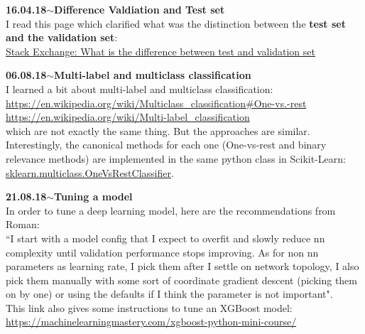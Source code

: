 \documentclass[11pt,a4paper]{article}
\newenvironment{loggentry}[2]%
{\noindent\textbf{#1}\hspace{1cm}$\mathbf{\sim}$\text{ }\textbf{#2}\\}{\vspace{0.5cm}}
\begin{document}
\begin{loggentry}{16.04.18}{Difference Valdiation and Test set}
I read this page which clarified what was the distinction between the \textbf{test set and the validation set}:\\
\href{https://stats.stackexchange.com/questions/19048/what-is-the-difference-between-test-set-and-validation-set#19051}{Stack Exchange: What is the difference between test and validation set}
\end{loggentry}

\begin{loggentry}{06.08.18}{Multi-label and multiclass classification}
I learned a bit about multi-label and multiclass classification:\\
\url{https://en.wikipedia.org/wiki/Multiclass_classification#One-vs.-rest}\\
\url{https://en.wikipedia.org/wiki/Multi-label_classification}\\
which are not exactly the same thing. But the approaches are similar. Interestingly, the canonical methods for each one (One-vs-rest and binary relevance methods) are implemented in the same python class in Scikit-Learn: \href{http://scikit-learn.org/stable/modules/generated/sklearn.multiclass.OneVsRestClassifier.html}{sklearn.multiclass.OneVsRestClassifier}.\\
\end{loggentry}

\begin{loggentry}{21.08.18}{Tuning a model}
In order to tune a deep learning model, here are the recommendations from Roman:\\
``I start with a model config that I expect to overfit and slowly reduce nn complexity until validation performance stops improving. As for non nn parameters as learning rate, I pick them after I settle on network topology, I also pick them manually with some sort of coordinate gradient descent (picking them on by one) or using the defaults if I think the parameter is not important".\\

This link also gives some instructions to tune an XGBoost model:\\
\url{https://machinelearningmastery.com/xgboost-python-mini-course/}\\

\end{loggentry}
\end{document}
